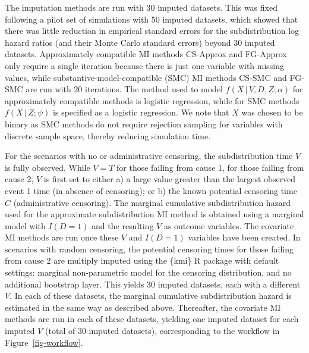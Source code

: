 \documentclass[
  letterpaper,
  DIV=11,
  numbers=noendperiod]{scrreprt}
\newcommand{\given}{\,|\,}
\begin{document}
The imputation methods are run with 30 imputed datasets. This was fixed
following a pilot set of simulations with 50 imputed datasets, which
showed that there was little reduction in empirical standard errors for
the subdistribution log hazard ratios (and their Monte Carlo standard
errors) beyond 30 imputed datasets. Approximately compatible MI methods
CS-Approx and FG-Approx only require a single iteration because there is
just one variable with missing values, while
substantive-model-compatible (SMC) MI methods CS-SMC and FG-SMC are run
with 20 iterations. The method used to model
\(f(X \given V, D, Z;\alpha)\) for approximately compatible methods is
logistic regression, while for SMC methods \(f(X \given Z;\psi)\) is
specified as a logistic regression. We note that \(X\) was chosen to be
binary as SMC methods do not require rejection sampling for variables
with discrete sample space, thereby reducing simulation time.

For the scenarios with no or administrative censoring, the
subdistribution time \(V\) is fully observed. While \(V = T\) for those
failing from cause 1, for those failing from cause 2, \(V\) is first set
to either a) a large value greater than the largest observed event 1
time (in absence of censoring); or b) the known potential censoring time
\(C\) (administrative censoring). The marginal cumulative
subdistribution hazard used for the approximate subdistribution MI
method is obtained using a marginal model with \(I(D=1)\) and the
resulting \(V\) as outcome variables. The covariate MI methods are run
once these \(V\) and \(I(D=1)\) variables have been created. In
scenarios with random censoring, the potential censoring times for those
failing from cause 2 are multiply imputed using the \{kmi\} R package
with default settings: marginal non-parametric model for the censoring
distribution, and no additional bootstrap layer. This yields 30 imputed
datasets, each with a different \(V\). In each of these datasets, the
marginal cumulative subdistribution hazard is estimated in the same way
as described above. Thereafter, the covariate MI methods are run in each
of these datasets, yielding one imputed dataset for each imputed \(V\)
(total of 30 imputed datasets), corresponding to the workflow in
Figure~\ref{fig-workflow}.
\end{document}

